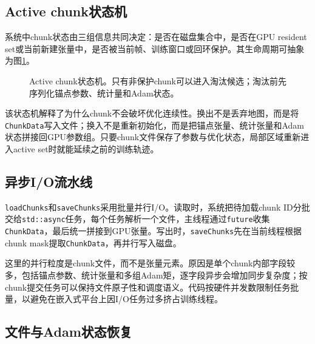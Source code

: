 \subsection{Active chunk状态机}

系统中chunk状态由三组信息共同决定：是否在磁盘集合中，是否在GPU resident set或当前新建张量中，是否被当前帧、训练窗口或回环保护。其生命周期可抽象为图\ref{fig:chunk_state_machine}。

\begin{figure}[htbp]
\centering
{}
\caption{Active chunk状态机。只有非保护chunk可以进入淘汰候选；淘汰前先序列化锚点参数、统计量和Adam状态。}
\label{fig:chunk_state_machine}
\end{figure}

该状态机解释了为什么chunk不会破坏优化连续性。换出不是丢弃地图，而是将\texttt{ChunkData}写入\schun 文件；换入不是重新初始化，而是把锚点张量、统计张量和Adam状态拼接回GPU参数组。只要chunk文件保存了参数与优化状态，局部区域重新进入active set时就能延续之前的训练轨迹。

\subsection{异步I/O流水线}

\texttt{loadChunks}和\texttt{saveChunks}采用批量并行I/O。读取时，系统把待加载chunk ID分批交给\texttt{std::async}任务，每个任务解析一个\schun 文件，主线程通过\texttt{future}收集\texttt{ChunkData}，最后统一拼接到GPU张量。写出时，\texttt{saveChunks}先在当前线程根据chunk mask提取\texttt{ChunkData}，再并行写入磁盘。

这里的并行粒度是chunk文件，而不是张量元素。原因是单个chunk内部字段较多，包括锚点参数、统计张量和多组Adam矩，逐字段异步会增加同步复杂度；按chunk提交任务可以保持文件原子性和调度语义。代码按硬件并发数限制任务批量，以避免在嵌入式平台上因I/O任务过多挤占训练线程。

\subsection{\schun 文件与Adam状态恢复}

